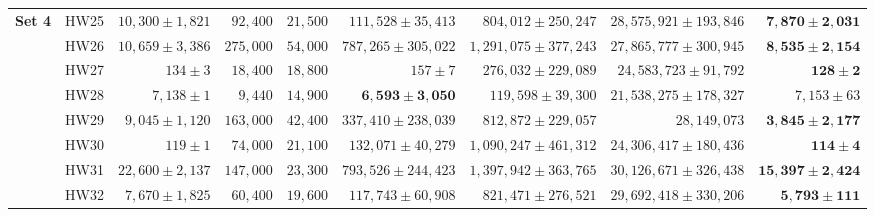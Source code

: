 \documentclass[pdflatex]{sn-jnl}
\begin{document}
\begin{table}
\begin{tabular}{l|r|r|r|r|r|r|r|r}
\multirow{8}{*}{\textbf{Set 4}}
& HW25 & $10,300 \pm 1,821$ & $92,400$ & $21,500$ & $111,528 \pm 35,413$ & $804,012 \pm 250,247$ & $28,575,921 \pm 193,846$ & $\mathbf{7,870 \pm 2,031}$ \\
& HW26 & $10,659 \pm 3,386$ & $275,000$ & $54,000$ & $787,265 \pm 305,022$ & $1,291,075 \pm 377,243$ & $27,865,777 \pm 300,945$ & $\mathbf{8,535 \pm 2,154}$ \\
& HW27 & $134 \pm 3$ & $18,400$ & $18,800$ & $157 \pm 7$ & $276,032 \pm 229,089$ & $24,583,723 \pm 91,792$ & $\mathbf{128 \pm 2}$ \\
& HW28 & $7,138 \pm 1$ & $9,440$ & $14,900$ & $\mathbf{6,593 \pm 3,050}$ & $119,598 \pm 39,300$ & $21,538,275 \pm 178,327$ & $7,153 \pm 63$ \\
& HW29 & $9,045 \pm 1,120$ & $163,000$ & $42,400$ & $337,410 \pm 238,039$ & $812,872 \pm 229,057$ & $28,149,073$ & $\mathbf{3,845 \pm 2,177}$ \\
& HW30 & $119 \pm 1$ & $74,000$ & $21,100$ & $132,071 \pm 40,279$ & $1,090,247 \pm 461,312$ & $24,306,417 \pm 180,436$ & $\mathbf{114 \pm 4}$ \\
& HW31 & $22,600 \pm 2,137$ & $147,000$ & $23,300$ & $793,526 \pm 244,423$ & $1,397,942 \pm 363,765$ & $30,126,671 \pm 326,438$ & $\mathbf{15,397 \pm 2,424}$ \\
& HW32 & $7,670 \pm 1,825$ & $60,400$ & $19,600$ & $117,743 \pm 60,908$ & $821,471 \pm 276,521$ & $29,692,418 \pm 330,206$ & $\mathbf{5,793 \pm 111}$ \\
\hline

\end{tabular}
\end{table}


\end{document}
